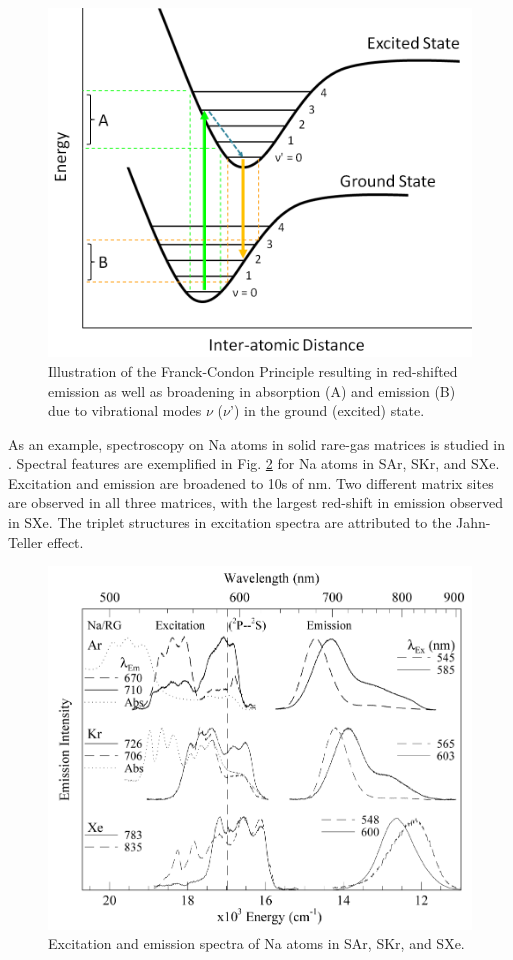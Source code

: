 \begin{figure} %
        \centering
                \includegraphics[width=.7\textwidth]{figures/FranckCondon.png}
                \caption{Illustration of the Franck-Condon Principle resulting in red-shifted emission as well as broadening in absorption (A) and emission (B) due to vibrational modes $\nu$ ($\nu$') in the ground (excited) state.}
\label{fig:FranckCondon}
\end{figure}

As an example, spectroscopy on Na atoms in solid rare-gas matrices is studied in \cite{matrixNa}.  Spectral features are exemplified in Fig. \ref{fig:matrixNa} for Na atoms in SAr, SKr, and SXe.  Excitation and emission are broadened to 10s of nm.  Two different matrix sites are observed in all three matrices, with the largest red-shift in emission observed in SXe.  The triplet structures in excitation spectra are attributed to the Jahn-Teller effect.

\begin{figure} %
        \centering
                \includegraphics[width=.7\textwidth]{figures/Na_in_matrices.png}
                \caption{Excitation and emission spectra of Na atoms in SAr, SKr, and SXe.  \cite{matrixNa}}
\label{fig:matrixNa}
\end{figure}


